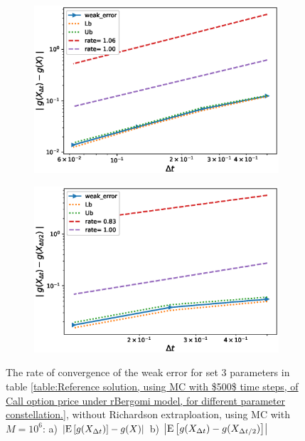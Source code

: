\documentclass[11pt]{article}
\newcommand{\expt}[1]{\mathrm{E}\left[#1\right]}
\begin{document}
\begin{figure}[!h]
	\centering
	\begin{subfigure}{.4\textwidth}
		\centering
		\includegraphics[width=1\linewidth]{./figures/rBergomi_weak_error_rates/without_richardson/H_007/weak_convergence_order_Bergomi_H_007_K_08_M_10_6_CI_relative}
		\caption{}
		\label{fig:sub3}
	\end{subfigure}%
	\begin{subfigure}{.4\textwidth}
		\centering
		\includegraphics[width=1\linewidth]{./figures/rBergomi_weak_error_rates/without_richardson/H_007/weak_convergence_order_differences_Bergomi_H_007_K_08_M_10_6_CI_relative}
		\caption{}
		\label{fig:sub4}
	\end{subfigure}
	
	\caption{The rate of convergence of the weak error for set $3$ parameters in table \ref{table:Reference solution, using MC with $500$ time steps, of Call option price under rBergomi model, for different parameter constellation.}, without Richardson extraploation, using MC with $M=10^6$: a) $\abs{\expt{g(X_{\Delta t})}-g(X)}$  b) $\abs{\expt{g(X_{\Delta t})-g(X_{\Delta t/2})}}$ }
	\label{fig:Weak_rate_H_007_without_rich_K_08}
\end{figure}
\end{document}

